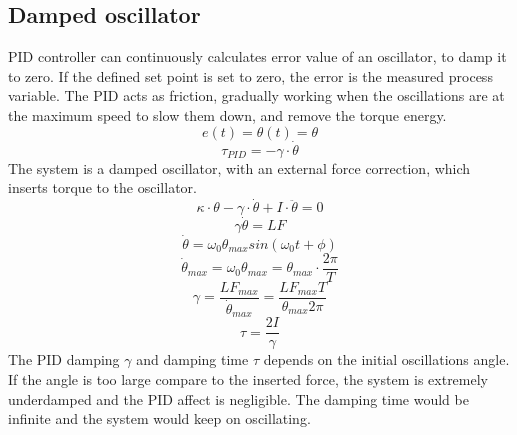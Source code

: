 \documentclass[\main/master.tex]{subfiles}
\begin{document}
\subsection{Damped oscillator}
PID controller can continuously calculates error value of an oscillator, to damp it to zero. If the defined set point is set to zero, the error is the measured process variable. The PID acts as friction, gradually working when the oscillations are at the maximum speed to slow them down, and remove the torque energy.
\begin{equation}
e(t) = \theta(t) = \theta   \label{eqn:error}
\end{equation}
\begin{equation}
\tau_{PID} = -\gamma\cdot\dot{\theta}   \label{eqn:friction_torque_pid}
\end{equation}
The system is a damped oscillator, with an external force correction, which inserts torque to the oscillator.
\begin{equation}
\kappa\cdot\theta - \gamma\cdot\dot{\theta}  + I\cdot\ddot{\theta} = 0   \label{eqn:damped_pid_motion_equation}
\end{equation}
\begin{equation}
\gamma\dot{\theta}  = LF   \label{eqn:damped_pid_motion_equation_1}
\end{equation}
\begin{equation}
\dot{\theta} = \omega_0\theta_{max}sin(\omega_0 t +\phi)    \label{eqn:undamped_motion_equation_1}
\end{equation}
\begin{equation}
\dot{\theta}_{max} = \omega_0\theta_{max} = \theta_{max}\cdot\frac{2\pi}{T}    \label{eqn:undamped_motion_equation_3}
\end{equation}
\begin{equation}
\gamma  = \frac{LF_{max}}{\dot{\theta}_{max}} =\frac{LF_{max}T}{\theta_{max}2\pi}    \label{eqn:damped_pid_motion_equation_2}
\end{equation}
\begin{equation}
\tau =  \frac{2I}{\gamma}  \label{eqn:damping_time_pid}
\end{equation}
The PID damping $\gamma$ and damping time $\tau$ depends on the initial oscillations angle. If the angle is too large compare to the inserted force, the system is extremely underdamped and the PID affect is negligible. The damping time would be infinite and the system would keep on oscillating.
\end{document}
